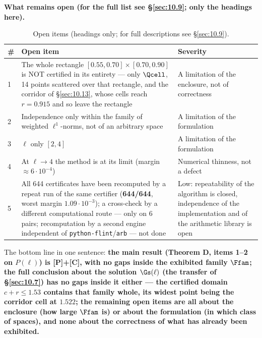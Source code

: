\textbf{What remains open (for the full list see \S\ref{sec:10.9}; only the headings here).}

\begin{table}[h]
\centering
\caption{Open items (headings only; for full descriptions see \S\ref{sec:10.9}).}
\label{tab:10.11-open}
\begin{tabular}{p{}p{}p{}}
\toprule
\# & Open item & Severity \\
\midrule
1 & The whole rectangle $[0.55,0.70]\times[0.70,0.90]$ is NOT certified in its entirety --- only $\Qcell$, 14 points scattered over that rectangle, and the corridor of \S\ref{sec:10.13}, whose cells reach $r = 0.915$ and so leave the rectangle & A limitation of the enclosure, not of correctness \\
2 & Independence only within the family of weighted $\ell^1$-norms, not of an arbitrary space & A limitation of the formulation \\
3 & $\ell$ only $[2,4]$ & A limitation of the formulation \\
4 & At $\ell \to 4$ the method is at its limit (margin $\approx 6\cdot 10^{-4}$) & Numerical thinness, not a defect \\
5 & All 644 certificates have been recomputed by a repeat run of the same certifier (\textbf{644/644}, worst margin $1.09\cdot 10^{-3}$); a cross-check by a different computational route --- only on 6 pairs; recomputation by a second engine independent of \texttt{python-flint}/\texttt{arb} --- not done & Low: repeatability of the algorithm is closed, independence of the implementation and of the arithmetic library is open \\
\bottomrule
\end{tabular}
\end{table}

The bottom line in one sentence: \textbf{the main result (Theorem D, items 1--2 on
$P(\ell)$) is [P]+[C], with no gaps inside the exhibited family $\Ffam$; the full
conclusion about the solution $\Gs(\ell)$ (the transfer of \S\ref{sec:10.7}) has no gaps
inside it either --- the certified domain $c+r\leq 1.53$ contains that family whole,
its widest point being the corridor cell at $1.522$; the remaining open
items are all about the enclosure (how large $\Ffam$ is) or about the formulation
(in which class of spaces), and none about the correctness of what has already
been exhibited.}

